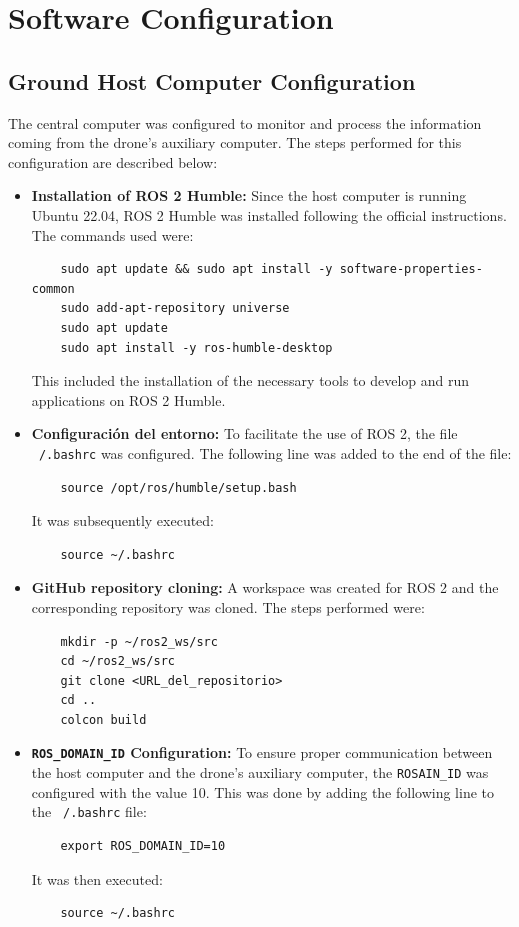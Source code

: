 \section{Software Configuration}

\subsection{Ground Host Computer Configuration} 
The central computer was configured to monitor and process the information coming from the drone's auxiliary computer. The steps performed for this configuration are described below:
\begin{itemize}
    \item \textbf{Installation of ROS 2 Humble:} 
    Since the host computer is running Ubuntu 22.04, ROS 2 Humble was installed following the official instructions. The commands used were:    \begin{verbatim}
    sudo apt update && sudo apt install -y software-properties-common
    sudo add-apt-repository universe
    sudo apt update
    sudo apt install -y ros-humble-desktop
    \end{verbatim}
    This included the installation of the necessary tools to develop and run applications on ROS 2 Humble.

    \item \textbf{Configuración del entorno:} 
    To facilitate the use of ROS 2, the file \texttt{~/.bashrc} was configured. The following line was added to the end of the file:
        \begin{verbatim}
    source /opt/ros/humble/setup.bash
    \end{verbatim}
    It was subsequently executed:
    \begin{verbatim}
    source ~/.bashrc
    \end{verbatim}

    \item \textbf{GitHub repository cloning:} 
    A workspace was created for ROS 2 and the corresponding repository was cloned. The steps performed were:
    \begin{verbatim}
    mkdir -p ~/ros2_ws/src
    cd ~/ros2_ws/src
    git clone <URL_del_repositorio>
    cd ..
    colcon build
    \end{verbatim}

    \item \textbf{\texttt{ROS\_DOMAIN\_ID} Configuration:} 
    To ensure proper communication between the host computer and the drone's auxiliary computer, the \texttt{ROSAIN_ID} was configured with the value 10. This was done by adding the following line to the \texttt{~/.bashrc} file:    \begin{verbatim}
    export ROS_DOMAIN_ID=10
    \end{verbatim}
    It was then executed:    \begin{verbatim}
    source ~/.bashrc
    \end{verbatim}
    

\end{itemize}
